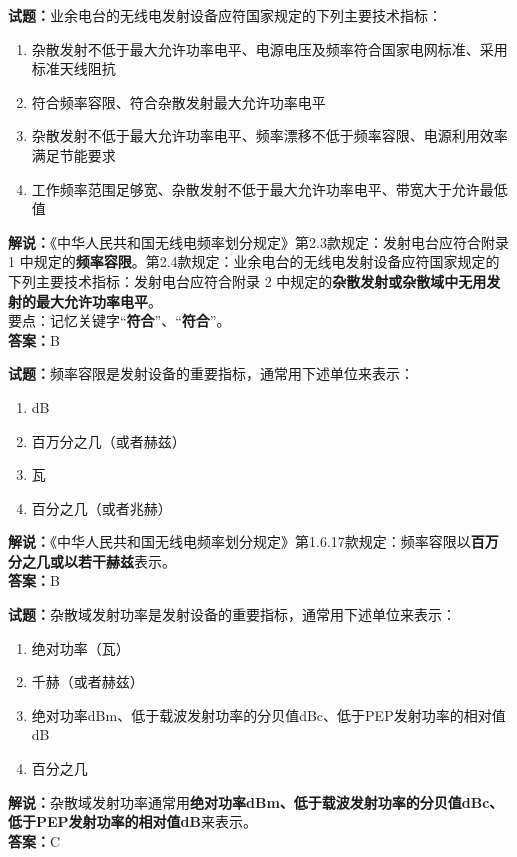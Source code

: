 \documentclass{ctexbook}
\begin{document}
\bigskip


\noindent\textbf{试题：}业余电台的无线电发射设备应符国家规定的下列主要技术指标：
\begin{enumerate}[leftmargin=3em]
\item 杂散发射不低于最大允许功率电平、电源电压及频率符合国家电网标准、采用标准天线阻抗
\item 符合频率容限、符合杂散发射最大允许功率电平
\item 杂散发射不低于最大允许功率电平、频率漂移不低于频率容限、电源利用效率满足节能要求
\item 工作频率范围足够宽、杂散发射不低于最大允许功率电平、带宽大于允许最低值
\end{enumerate}
\noindent\textbf{解说：}《中华人民共和国无线电频率划分规定》第2.3款规定：发射电台应符合附录 1 中规定的\textbf{频率容限}。第2.4款规定：业余电台的无线电发射设备应符国家规定的下列主要技术指标：发射电台应符合附录 2 中规定的\textbf{杂散发射或杂散域中无用发射的最大允许功率电平}。\\要点：记忆关键字“\textbf{符合}”、“\textbf{符合}”。\\\noindent\textbf{答案：}B




\bigskip


\noindent\textbf{试题：}频率容限是发射设备的重要指标，通常用下述单位来表示：
\begin{enumerate}[leftmargin=3em]
\item dB
\item 百万分之几（或者赫兹）
\item 瓦
\item 百分之几（或者兆赫）
\end{enumerate}
\noindent\textbf{解说：}《中华人民共和国无线电频率划分规定》第1.6.17款规定：频率容限以\textbf{百万分之几或以若干赫兹}表示。\\\noindent\textbf{答案：}B




\bigskip


\noindent\textbf{试题：}杂散域发射功率是发射设备的重要指标，通常用下述单位来表示：
\begin{enumerate}[leftmargin=3em]
\item 绝对功率（瓦）
\item 千赫（或者赫兹）%
\item 绝对功率dBm、低于载波发射功率的分贝值dBc、低于PEP发射功率的相对值dB
\item 百分之几
\end{enumerate}
\noindent\textbf{解说：}杂散域发射功率通常用\textbf{绝对功率dBm、低于载波发射功率的分贝值dBc、低于PEP发射功率的相对值dB}来表示。\\\noindent\textbf{答案：}C
\end{document}
